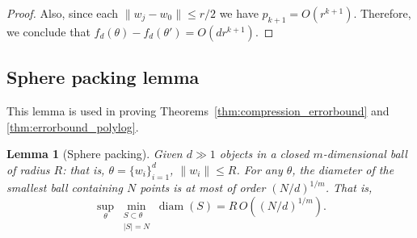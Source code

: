 \documentclass{article}
\theoremstyle{plain}
\newtheorem{lemma}{Lemma}
\begin{document}
\begin{proof}
    Also, since each $\|w_j-w_0\| \leq r/2$ we have $p_{k+1} = O(r^{k+1})$. Therefore, we conclude that $f_d(\theta) - f_d(\theta') = O(dr^{k+1})$. 
\end{proof}


\subsection{Sphere packing lemma}

This lemma is used in proving Theorems~\ref{thm:compression_errorbound} and \ref{thm:errorbound_polylog}. 

\begin{lemma}[Sphere packing]   \label{lemma:pack_many_pts}
    Given $d\gg 1$ objects in a closed $m$-dimensional ball of radius $R$: that is, $\theta=\{w_i\}_{i=1}^d$, $\|w_i\|\leq R$. For any $\theta$, the diameter of the smallest ball containing $N$ points is at most of order $(N/d)^{1/m}$. That is, 
    \begin{equation}
        \sup_{\theta} \min_{\substack{S\subset\theta\\|S|=N}} \operatorname{diam}(S) = R \,O\left( (N/d)^{1/m} \right) .
    \end{equation}
\end{lemma}
\end{document}

